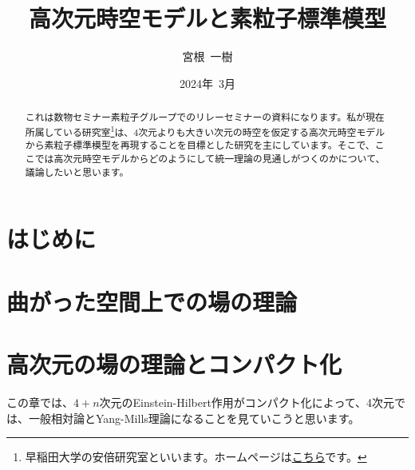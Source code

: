 \documentclass[unicode,a4paper,10pt]{ltjsarticle}
\title{高次元時空モデルと素粒子標準模型}
\author{宮根\ 一樹}
\date{2024年\ 3月}
\begin{document}
\maketitle

\begin{abstract}
   これは数物セミナー素粒子グループでのリレーセミナーの資料になります。私が現在所属している研究室\footnote{
      早稲田大学の安倍研究室といいます。ホームページは\href{http://www.hep.phys.waseda.ac.jp/index-j.html}{こちら}です。
   }は、4次元よりも大きい次元の時空を仮定する高次元時空モデルから素粒子標準模型を再現することを目標とした研究を主にしています。そこで、ここでは高次元時空モデルからどのようにして統一理論の見通しがつくのかについて、議論したいと思います。
\end{abstract}

\tableofcontents

\clearpage

\section{はじめに}










\clearpage

\section{曲がった空間上での場の理論}




























\clearpage

\section{高次元の場の理論とコンパクト化}

この章では、$4+n$次元のEinstein-Hilbert作用がコンパクト化によって、4次元では、一般相対論とYang-Mills理論になることを見ていこうと思います。
\end{document}

